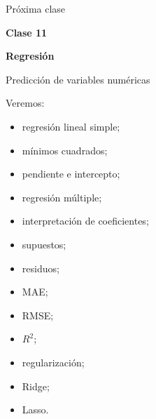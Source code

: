\documentclass[aspectratio=169,11pt]{beamer}
\begin{document}
\begin{frame}{Próxima clase}

\begin{center}

{\Huge
\textbf{Clase 11}
}

\vspace{0.4cm}

{\LARGE
\textcolor{azulmarista}{
\textbf{Regresión}
}
}

\vspace{0.3cm}

{\Large
Predicción de variables numéricas
}

\end{center}

\vspace{0.5cm}

Veremos:

\begin{itemize}

    \item regresión lineal simple;

    \item mínimos cuadrados;

    \item pendiente e intercepto;

    \item regresión múltiple;

    \item interpretación de coeficientes;

    \item supuestos;

    \item residuos;

    \item MAE;

    \item RMSE;

    \item $R^2$;

    \item regularización;

    \item Ridge;

    \item Lasso.

\end{itemize}

\end{frame}

\end{document}
